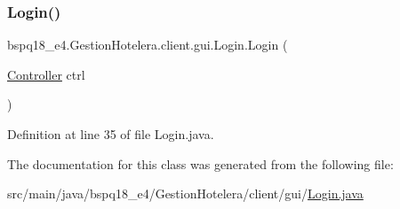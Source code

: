 \subsubsection{\texorpdfstring{Login()}{Login()}}
{\footnotesize\ttfamily bspq18\+\_\+e4.\+Gestion\+Hotelera.\+client.\+gui.\+Login.\+Login (\begin{DoxyParamCaption}\item[{\mbox{\hyperlink{classbspq18__e4_1_1_gestion_hotelera_1_1client_1_1controller_1_1_controller}{Controller}}}]{ctrl }\end{DoxyParamCaption})}



Definition at line 35 of file Login.\+java.



The documentation for this class was generated from the following file\+:\begin{DoxyCompactItemize}
\item 
src/main/java/bspq18\+\_\+e4/\+Gestion\+Hotelera/client/gui/\mbox{\hyperlink{_login_8java}{Login.\+java}}\end{DoxyCompactItemize}
